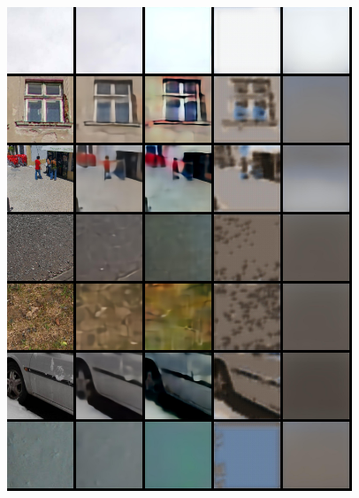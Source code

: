 \begin{appendices}
\begin{figure}
    \includegraphics[width=0.92\textwidth]{figures/ptz/train_stacked_3}
\end{figure}
\begin{figure}
    \centering

\end{figure}
\end{appendices}
